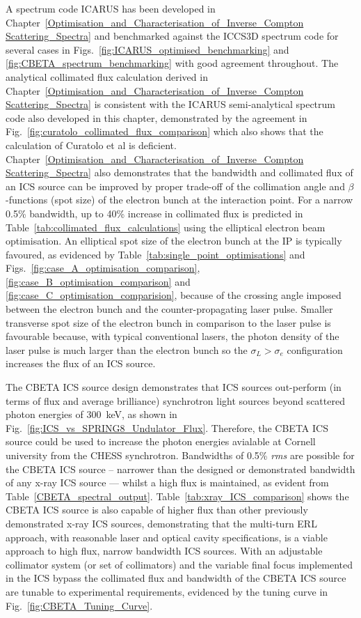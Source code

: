 \documentclass[../main.tex]{subfiles}
\begin{document}
A spectrum code \textsc{ICARUS} has been developed in Chapter~\ref{Optimisation_and_Characterisation_of_Inverse_Compton Scattering_Spectra} and benchmarked against the \textsc{ICCS3D} spectrum code for several cases in Figs.~\ref{fig:ICARUS_optimised_benchmarking} and \ref{fig:CBETA_spectrum_benchmarking} with good agreement throughout. The analytical collimated flux calculation derived in Chapter~\ref{Optimisation_and_Characterisation_of_Inverse_Compton Scattering_Spectra} is consistent with the \textsc{ICARUS} semi-analytical spectrum code also developed in this chapter, demonstrated by the agreement in Fig.~\ref{fig:curatolo_collimated_flux_comparison} which also shows that the calculation of Curatolo et al \cite{curatolo2017analytical} is deficient. Chapter~\ref{Optimisation_and_Characterisation_of_Inverse_Compton Scattering_Spectra} also demonstrates that the bandwidth and collimated flux of an ICS source can be improved by proper trade-off of the collimation angle and $\beta$-functions (spot size) of the electron bunch at the interaction point. For a narrow 0.5\% bandwidth, up to 40\% increase in collimated flux is predicted in Table~\ref{tab:collimated_flux_calculations} using the elliptical electron beam optimisation. An elliptical spot size of the electron bunch at the IP is typically favoured, as evidenced by Table~\ref{tab:single_point_optimisations} and Figs.~\ref{fig:case_A_optimisation_comparison}, \ref{fig:case_B_optimisation_comparison} and \ref{fig:case_C_optimisation_comparision}, because of the crossing angle imposed between the electron bunch and the counter-propagating laser pulse. Smaller transverse spot size of the electron bunch in comparison to the laser pulse is favourable because, with typical conventional lasers, the photon density of the laser pulse is much larger than the electron bunch so the $\sigma_{L}>\sigma_{e}$ configuration increases the flux of an ICS source. 

The CBETA ICS source design demonstrates that ICS sources out-perform (in terms of flux and average brilliance) synchrotron light sources beyond scattered photon energies of 300~\si{\kilo\electronvolt}, as shown in Fig.~\ref{fig:ICS_vs_SPRING8_Undulator_Flux}. Therefore, the CBETA ICS source could be used to increase the photon energies avialable at Cornell university from the CHESS synchrotron. Bandwidths of 0.5\% \textit{rms} are possible for the CBETA ICS source -- narrower than the designed or demonstrated bandwidth of any x-ray ICS source --- whilst a high flux is maintained, as evident from Table~\ref{CBETA_spectral_output}. Table~\ref{tab:xray_ICS_comparison} shows the CBETA ICS source is also capable of higher flux than other previously demonstrated x-ray ICS sources, demonstrating that the multi-turn ERL approach, with reasonable laser and optical cavity specifications, is a viable approach to high flux, narrow bandwidth ICS sources. With an adjustable collimator system (or set of collimators) and the variable final focus implemented in the ICS bypass the collimated flux and bandwidth of the CBETA ICS source are tunable to experimental requirements, evidenced by the tuning curve in Fig.~\ref{fig:CBETA_Tuning_Curve}.   
\end{document}

